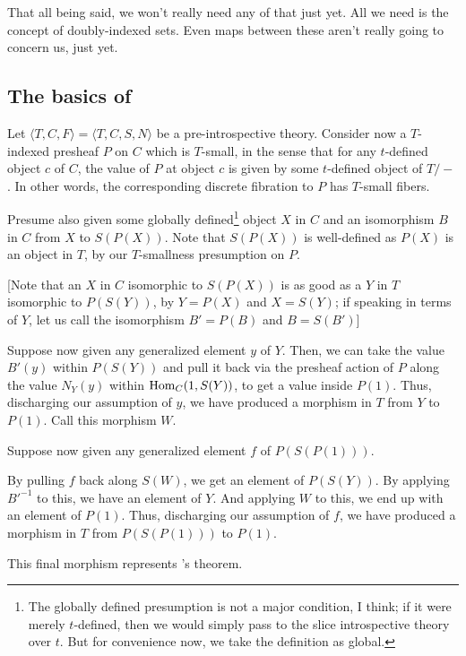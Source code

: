 That all being said, we won't really need any of that just yet. All we need is the concept of doubly-indexed sets. Even maps between these aren't really going to concern us, just yet.

\subsection{The basics of \Loeb}
Let $\langle T, C, F \rangle = \langle T, C, S, N \rangle$ be a pre-introspective theory. Consider now a $T$-indexed presheaf $P$ on $C$ which is $T$-small, in the sense that for any $t$-defined object $c$ of $C$, the value of $P$ at object $c$ is given by some $t$-defined object of $T/-$. In other words, the corresponding discrete fibration to $P$ has $T$-small fibers.

Presume also given some globally defined\footnote{The globally defined presumption is not a major condition, I think; if it were merely $t$-defined, then we would simply pass to the slice introspective theory over $t$. But for convenience now, we take the definition as global. } object $X$ in $C$ and an isomorphism $B$ in $C$ from $X$ to $S(P(X))$. Note that $S(P(X))$ is well-defined as $P(X)$ is an object in $T$, by our $T$-smallness presumption on $P$.

[Note that an $X$ in $C$ isomorphic to $S(P(X))$ is as good as a $Y$ in $T$ isomorphic to $P(S(Y))$, by $Y = P(X)$ and $X = S(Y)$; if speaking in terms of $Y$, let us call the isomorphism $B' = P(B)$ and $B = S(B')$]

Suppose now given any generalized element $y$ of $Y$. Then, we can take the value $B'(y)$ within $P(S(Y))$ and pull it back via the presheaf action of $P$ along the value $N_Y(y)$ within $\operatorname{Hom}_C(1, S(Y))$, to get a value inside $P(1)$. Thus, discharging our assumption of $y$, we have produced a morphism in $T$ from $Y$ to $P(1)$. Call this morphism $W$.

Suppose now given any generalized element $f$ of $P(S(P(1)))$.

By pulling $f$ back along $S(W)$, we get an element of $P(S(Y))$. By applying $B'^{-1}$ to this, we have an element of $Y$. And applying $W$ to this, we end up with an element of $P(1)$. Thus, discharging our assumption of $f$, we have produced a morphism in $T$ from $P(S(P(1)))$ to $P(1)$.

This final morphism represents \Loeb's theorem. 

